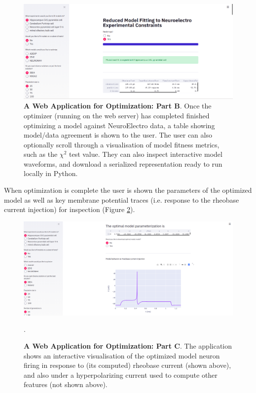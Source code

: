 \begin{figure}
\begin{center}
\includegraphics[scale=1]{chapters/app_tex/app_results}
\end{center}
\caption[Web Application (2)]{\textbf{A Web Application for Optimization: Part B}.
Once the optimizer (running on the web server) has completed finished optimizing a model against NeuroElectro data, a table showing model/data agreement is shown to the user.
The user can also optionally scroll through a visualisation of model fitness metrics, such as the $\chi^{2}$ test value.
They can also inspect interactive model waveforms, and download a serialized representation ready to run locally in Python.}
\label{fig:web-app-2}
\end{figure}

When optimization is complete the user is shown the parameters of the optimized model as well as key membrane potential traces (i.e. response to the rheobase current injection) for inspection (Figure \ref{fig:web-app-3}).

\begin{figure}
\begin{center}
\includegraphics[scale=1]{chapters/app_tex/more_app_results}
\end{center}
\caption[Web Application (3)]{\textbf{A Web Application for Optimization: Part C}.
The application shows an interactive visualisation of the optimized model neuron firing in response to (its computed) rheobase current (shown above), and also under a hyperpolarizing current used to compute other features (not shown above).}
\label{fig:web-app-3}.
\end{figure}

